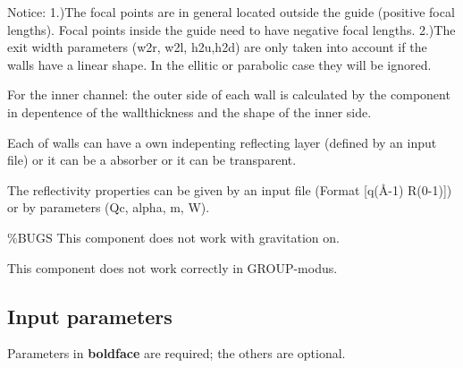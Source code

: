 Notice: 1.)The focal points are in general located outside the guide (positive focal lengths). Focal points inside the guide need to have negative focal lengths. 2.)The exit width parameters (w2r, w2l, h2u,h2d) are only taken into account if the walls have a linear shape. In the ellitic or parabolic case they will be ignored.

For the inner channel: the outer side of each wall is calculated by the component in depentence of the wallthickness and the shape of the inner side.

Each of walls can have a own indepenting reflecting layer (defined by an input file) or it can be a absorber or it can be transparent.

The reflectivity properties can be given by an input file (Format [q(\AA{}-1) R(0-1)]) or by parameters (Qc, alpha, m, W).

\%BUGS This component does not work with gravitation on.

This component does not work correctly in GROUP-modus.

\subsection*{Input parameters}
Parameters in \textbf{boldface} are required; the others are optional.

